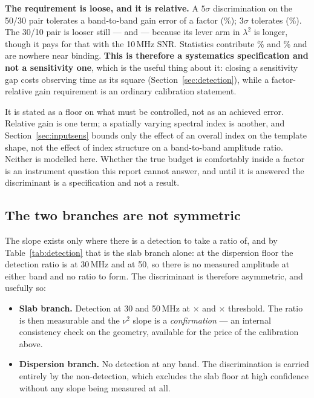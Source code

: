 \documentclass[11pt]{article}
\newcommand{\lamsq}{\ensuremath{\lambda^{2}}}
\begin{document}
\textbf{The requirement is loose, and it is relative.} A $5\sigma$
discrimination on the 50/30 pair tolerates a band-to-band gain error of
a factor \slopeFactorFiveFiftyThirty{} (\slopeBudgetFiveFiftyThirty\%);
$3\sigma$ tolerates \slopeFactorThreeFiftyThirty{}
(\slopeBudgetThreeFiftyThirty\%). The 30/10 pair is looser still ---
\slopeFactorFiveThirtyTen{} and \slopeFactorThreeThirtyTen{} --- because
its lever arm in $\lamsq$ is longer, though it pays for that with the
10\,MHz SNR. Statistics contribute \slopeStatFiftyThirty\% and
\slopeStatThirtyTen\% and are nowhere near binding. \textbf{This is
therefore a systematics specification and not a sensitivity one},
which is the useful thing about it: closing a sensitivity gap costs
observing time as its square (Section~\ref{sec:detection}), while a
factor-\slopeFactorFiveFiftyThirty{} relative gain requirement is an
ordinary calibration statement.

It is stated as a floor on what must be controlled, not as an achieved
error. Relative gain is one term; a spatially varying spectral index is
another, and Section~\ref{sec:inputsens} bounds only the effect of an
overall index on the template shape, not the effect of index structure
on a band-to-band amplitude ratio. Neither is modelled here. Whether
the true budget is comfortably inside a factor
\slopeFactorFiveFiftyThirty{} is an instrument question this report
cannot answer, and until it is answered the discriminant is a
specification and not a result.

\subsection{The two branches are not symmetric}
\label{sec:asymmetry}

The slope exists only where there is a detection to take a ratio of,
and by Table~\ref{tab:detection} that is the slab branch alone: at the
dispersion floor the detection ratio is \detSafeDispThirty{} at
30\,MHz and \detSafeDispFifty{} at 50, so there is no measured
amplitude at either band and no ratio to form. The discriminant is
therefore asymmetric, and usefully so:

\begin{itemize}
  \item \textbf{Slab branch.} Detection at 30 and 50\,MHz at
    \detSafeSlabThirty$\times$ and \detSafeSlabFifty$\times$
    threshold. The ratio is then measurable and the $\nu^{2}$ slope is
    a \emph{confirmation} --- an internal consistency check on the
    geometry, available for the price of the calibration above.
  \item \textbf{Dispersion branch.} No detection at any band. The
    discrimination is carried entirely by the non-detection, which
    excludes the slab floor at high confidence without any slope being
    measured at all.
\end{itemize}
\end{document}
